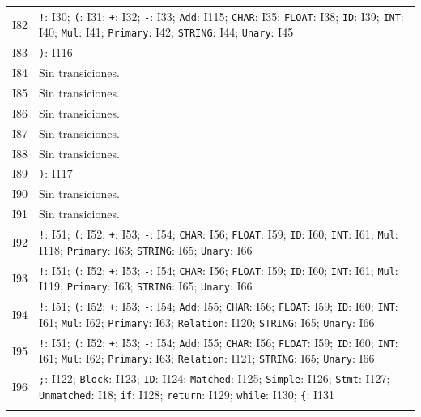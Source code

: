 {\begin{longtable}{@{}r p{14.7cm}@{}}
I82 & \texttt{!}: I30; \texttt{(}: I31; \texttt{+}: I32; \texttt{-}: I33; \texttt{Add}: I115; \texttt{CHAR}: I35; \texttt{FLOAT}: I38; \texttt{ID}: I39; \texttt{INT}: I40; \texttt{Mul}: I41; \texttt{Primary}: I42; \texttt{STRING}: I44; \texttt{Unary}: I45\\\addlinespace[3pt]
I83 & \texttt{)}: I116\\\addlinespace[3pt]
I84 & Sin transiciones.\\\addlinespace[3pt]
I85 & Sin transiciones.\\\addlinespace[3pt]
I86 & Sin transiciones.\\\addlinespace[3pt]
I87 & Sin transiciones.\\\addlinespace[3pt]
I88 & Sin transiciones.\\\addlinespace[3pt]
I89 & \texttt{)}: I117\\\addlinespace[3pt]
I90 & Sin transiciones.\\\addlinespace[3pt]
I91 & Sin transiciones.\\\addlinespace[3pt]
I92 & \texttt{!}: I51; \texttt{(}: I52; \texttt{+}: I53; \texttt{-}: I54; \texttt{CHAR}: I56; \texttt{FLOAT}: I59; \texttt{ID}: I60; \texttt{INT}: I61; \texttt{Mul}: I118; \texttt{Primary}: I63; \texttt{STRING}: I65; \texttt{Unary}: I66\\\addlinespace[3pt]
I93 & \texttt{!}: I51; \texttt{(}: I52; \texttt{+}: I53; \texttt{-}: I54; \texttt{CHAR}: I56; \texttt{FLOAT}: I59; \texttt{ID}: I60; \texttt{INT}: I61; \texttt{Mul}: I119; \texttt{Primary}: I63; \texttt{STRING}: I65; \texttt{Unary}: I66\\\addlinespace[3pt]
I94 & \texttt{!}: I51; \texttt{(}: I52; \texttt{+}: I53; \texttt{-}: I54; \texttt{Add}: I55; \texttt{CHAR}: I56; \texttt{FLOAT}: I59; \texttt{ID}: I60; \texttt{INT}: I61; \texttt{Mul}: I62; \texttt{Primary}: I63; \texttt{Relation}: I120; \texttt{STRING}: I65; \texttt{Unary}: I66\\\addlinespace[3pt]
I95 & \texttt{!}: I51; \texttt{(}: I52; \texttt{+}: I53; \texttt{-}: I54; \texttt{Add}: I55; \texttt{CHAR}: I56; \texttt{FLOAT}: I59; \texttt{ID}: I60; \texttt{INT}: I61; \texttt{Mul}: I62; \texttt{Primary}: I63; \texttt{Relation}: I121; \texttt{STRING}: I65; \texttt{Unary}: I66\\\addlinespace[3pt]
I96 & \texttt{;}: I122; \texttt{Block}: I123; \texttt{ID}: I124; \texttt{Matched}: I125; \texttt{Simple}: I126; \texttt{Stmt}: I127; \texttt{Unmatched}: I18; \texttt{if}: I128; \texttt{return}: I129; \texttt{while}: I130; \texttt{\{}: I131\\\addlinespace[3pt]

\end{longtable}}
